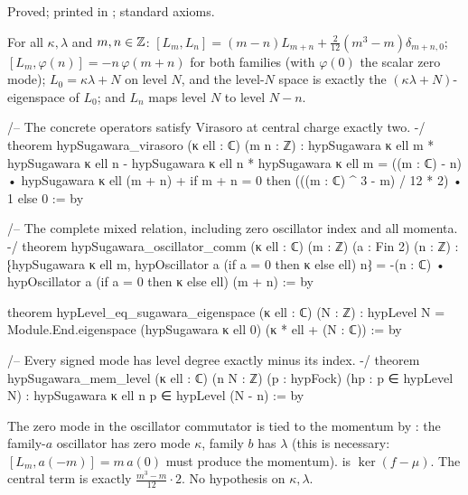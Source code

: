 \begin{status}
Proved; printed in ; standard axioms.
\end{status}

\begin{theorem}[Virasoro with $c=2$; oscillator commutators; degree]\label{ch17:thm:hypvirasoro}
For all $\kappa,\lambda$ and $m,n\in{\mathbb{Z}}$:
$[L_m,L_n]=(m-n)L_{m+n}+\tfrac{2}{12}(m^3-m)\delta_{m+n,0}$; $[L_m,\varphi(n)]=-n\,\varphi(m+n)$ for both families (with
$\varphi(0)$ the scalar zero mode); $L_0=\kappa\lambda+N$ on level $N$, and the level-$N$ space is exactly the
$(\kappa\lambda+N)$-eigenspace of $L_0$; and $L_n$ maps level $N$ to level $N-n$.
\end{theorem}

\begin{leancode}
/-- The concrete operators satisfy Virasoro at central charge exactly two. -/
theorem hypSugawara_virasoro (κ ell : ℂ) (m n : ℤ) :
    hypSugawara κ ell m * hypSugawara κ ell n -
      hypSugawara κ ell n * hypSugawara κ ell m =
      ((m : ℂ) - n) • hypSugawara κ ell (m + n) +
        if m + n = 0 then (((m : ℂ) ^ 3 - m) / 12 * 2) • 1 else 0 := by

/-- The complete mixed relation, including zero oscillator index and all momenta. -/
theorem hypSugawara_oscillator_comm (κ ell : ℂ) (m : ℤ) (a : Fin 2) (n : ℤ) :
    ⁅hypSugawara κ ell m, hypOscillator a (if a = 0 then κ else ell) n⁆ =
      -(n : ℂ) • hypOscillator a (if a = 0 then κ else ell) (m + n) := by

theorem hypLevel_eq_sugawara_eigenspace (κ ell : ℂ) (N : ℤ) :
    hypLevel N = Module.End.eigenspace (hypSugawara κ ell 0) (κ * ell + (N : ℂ)) := by

/-- Every signed mode has level degree exactly minus its index. -/
theorem hypSugawara_mem_level (κ ell : ℂ) (n N : ℤ) (p : hypFock)
    (hp : p ∈ hypLevel N) : hypSugawara κ ell n p ∈ hypLevel (N - n) := by
\end{leancode}

\begin{dictionary}
The zero mode in the oscillator commutator is tied to the momentum by : the
family-$a$ oscillator has zero mode $\kappa$, family $b$ has $\lambda$ (this is necessary: $[L_m,a(-m)]=m\,a(0)$ must
produce the momentum).   is $\ker(f-\mu)$.  The central term is exactly
$\frac{m^3-m}{12}\cdot2$.  No hypothesis on $\kappa,\lambda$.
\end{dictionary}

